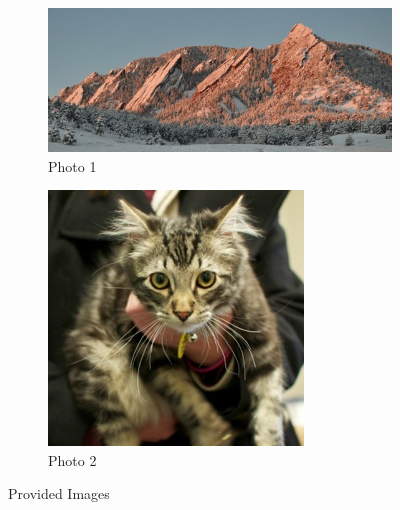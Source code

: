 \documentclass[10pt]{report}
\begin{document}

    \begin{figure}[ht]
        \centering
        \begin{subfigure}{\textwidth}
            \centering
            \includegraphics[scale=0.7]{./img/photo1.png}
            \caption{Photo 1}
            \label{fig:p1}
        \end{subfigure}
        \begin{subfigure}{\textwidth}
            \centering
            \includegraphics[scale=0.7]{./img/photo2.png}
            \caption{Photo 2}
            \label{fig:p2}
        \end{subfigure}
        \caption{Provided Images}
        \label{fig:init_image}
    \end{figure}
\end{document}
